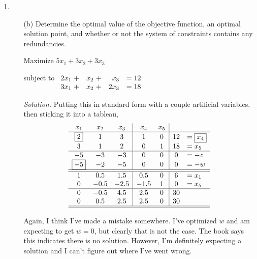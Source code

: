 \documentclass{homework}
\newcommand{\solution}{	\vspace{1em} \textit{Solution.} \quad }
\newcommand{\bolditem}[1][YYY]{\item[\textbf{#1}]}
\begin{document}
\begin{enumerate}
	
		\pagebreak
		\bolditem[3.7.3] \begin{enumerate}
			\item[(b)] Determine the optimal value of the objective function, an optimal solution point, and whether or not the system of constraints contains any redundancies. 
			
			Maximize $5x_1 + 3 x_2 + 3 x_3$
			
			subject to $\begin{array}[t]{rrrl}
				2 x_1 ~ + & x_2 ~ + & x_3 & = 12 \\
				3 x_1 ~ + & x_2 ~ + & 2 x_3 & = 18 \\
			\end{array}$
		
			\solution Putting this in standard form with a couple artificial variables, then sticking it into a tableau,
			\[ 
				\begin{array}{ccc|cc|cl}
					x_1 & x_2 & x_3 & x_4 & x_5 & & \\
					\hline
					\boxed{2} & 1 & 3 & 1 & 0 & 12 & = \boxed{x_4} \\
					3 & 1 & 2 & 0 & 1 & 18 & = x_5 \\
					\hline
					-5 & -3 & -3 & 0 & 0 & 0 & = -z \\
					\boxed{-5} & -2 & -5 & 0 & 0 & 0 & = -w \\
					\hline \hline
					1 & 0.5 & 1.5 & 0.5 & 0 & 6 & = x_1 \\
					0 & -0.5& -2.5& -1.5& 1& 0 & = x_5 \\
					\hline
					0 & -0.5& 4.5& 2.5& 0& 30 \\
					0 & 0.5 & 2.5& 2.5& 0& 30 \\
					\hline \hline
				\end{array}
			\]
			
			Again, I think I've made a mistake somewhere. I've optimized $w$ and am expecting to get $w=0$, but clearly that is not the case. The book says this indicates there is no solution. However, I'm definitely expecting a solution and I can't figure out where I've went wrong.
		\end{enumerate}
	\end{enumerate}
\end{document}
